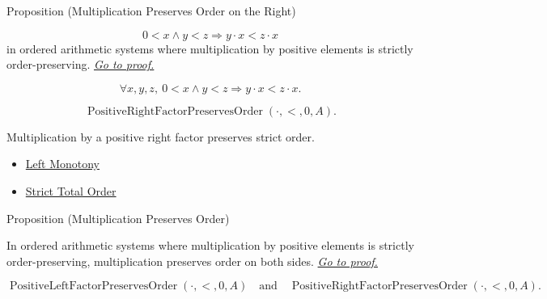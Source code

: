 \begin{propositionbox}{Proposition (Multiplication Preserves Order on the Right)}
\begin{proposition}
\label{prop:multiplication-order-compatibility-right}
\[
0<x \land y<z \Longrightarrow y\cdot x<z\cdot x
\]
in ordered arithmetic systems where multiplication by positive elements is
strictly order-preserving.
\hyperref[prf:multiplication-order-compatibility-right]{\textit{Go to proof.}}
\end{proposition}
\end{propositionbox}

\begin{remark*}
\[
\forall x,y,z,\ 0<x \land y<z \Longrightarrow y\cdot x<z\cdot x.
\]
\end{remark*}

\begin{remark*}
\[
\operatorname{PositiveRightFactorPreservesOrder}(\cdot,<,0,A).
\]
\end{remark*}

\begin{remark*}[Interpretation]
Multiplication by a positive right factor preserves strict order.
\end{remark*}

\begin{dependencies}
\begin{itemize}
  \item \hyperref[def:left-monotony]{Left Monotony}
  \item \hyperref[def:strict-total-order]{Strict Total Order}
\end{itemize}
\end{dependencies}

\begin{propositionbox}{Proposition (Multiplication Preserves Order)}
\begin{proposition}
\label{prop:multiplication-order-compatibility}
In ordered arithmetic systems where multiplication by positive elements is
strictly order-preserving, multiplication preserves order on both sides.
\hyperref[prf:multiplication-order-compatibility]{\textit{Go to proof.}}
\end{proposition}
\end{propositionbox}

\begin{remark*}
\[
\operatorname{PositiveLeftFactorPreservesOrder}(\cdot,<,0,A)
\quad\text{and}\quad
\operatorname{PositiveRightFactorPreservesOrder}(\cdot,<,0,A).
\]
\end{remark*}

